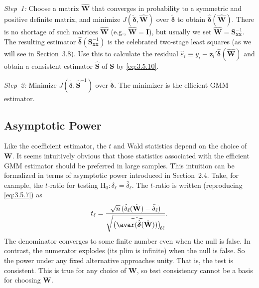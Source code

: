 \medskip
\noindent\emph{Step~1:} Choose a matrix $\hat{\mathbf{W}}$ that converges in probability to a symmetric and positive
definite matrix, and minimize $J(\tilde{\boldsymbol{\delta}}, \hat{\mathbf{W}})$ over
$\tilde{\boldsymbol{\delta}}$ to obtain $\hat{\boldsymbol{\delta}}(\hat{\mathbf{W}})$.  There
is no shortage of such matrices $\hat{\mathbf{W}}$ (e.g., $\hat{\mathbf{W}} = \mathbf{I}$), but
usually we set $\hat{\mathbf{W}} = \mathbf{S}_{\mathbf{xx}}^{-1}$.  The resulting estimator
$\hat{\boldsymbol{\delta}}(\mathbf{S}_{\mathbf{xx}}^{-1})$ is the celebrated two-stage least
squares (as we will see in Section~3.8).  Use this to calculate the residual
$\hat{\varepsilon}_i \equiv y_i - \mathbf{z}_i' \hat{\boldsymbol{\delta}}(\hat{\mathbf{W}})$ and obtain
a consistent estimator $\hat{\mathbf{S}}$ of $\mathbf{S}$ by \eqref{eq:3.5.10}.

\medskip
\noindent\emph{Step~2:} Minimize
$J(\tilde{\boldsymbol{\delta}}, \hat{\mathbf{S}}^{-1})$ over $\tilde{\boldsymbol{\delta}}$.
The minimizer is the efficient GMM estimator.

\subsection*{Asymptotic Power}

Like the coefficient estimator, the $t$ and Wald statistics depend on the choice of
$\mathbf{W}$.  It seems intuitively obvious that those statistics associated with the efficient GMM
estimator should be preferred in large samples.  This intuition can be formalized in
terms of asymptotic power introduced in Section~2.4.  Take, for example, the $t$-ratio
for testing $\mathrm{H}_0\colon \delta_\ell = \bar{\delta}_\ell$.  The $t$-ratio is written (reproducing
\eqref{eq:3.5.7}) as
\begin{equation}
  t_\ell = \frac{\sqrt{n}\,(\hat{\delta}_\ell(\hat{\mathbf{W}})
    - \bar{\delta}_\ell)}
    {\sqrt{\bigl(\widehat{\avar(\hat{\boldsymbol{\delta}}(\hat{\mathbf{W}}))}\bigr)_{\!\ell\ell}}}.
  \label{eq:3.5.17}
\end{equation}
The denominator converges to some finite number even when the null is false.
In contrast, the numerator explodes (its plim is infinite) when the null is false.
So the power under any fixed alternative approaches unity.  That is, the test is
consistent.  This is true for any choice of $\mathbf{W}$, so test consistency cannot be a basis
for choosing $\mathbf{W}$.

